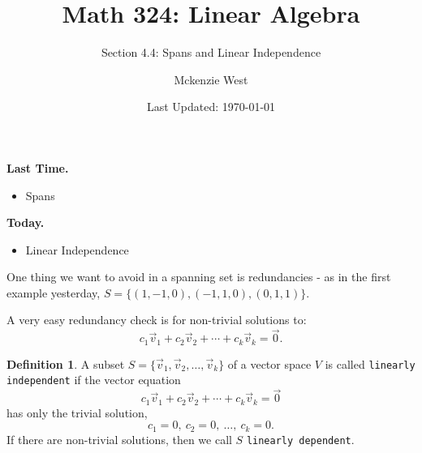\documentclass{beamer}
\newcommand{\fn}{\insertframenumber}
\theoremstyle{definition}
\newtheorem*{defn}{Definition}
\renewcommand{\emph}[1]{{\color{blue}\texttt{#1}}}
\begin{document}
	\title{Math 324: Linear Algebra}
	\subtitle{Section 4.4: Spans and Linear Independence}
	\author{Mckenzie West}
	\date{Last Updated: \today}
\begin{frame}
\maketitle
\end{frame}
\usebackgroundtemplate{} 
\begin{frame}{\insertframenumber}
	\begin{block}{\textbf{Last Time.}}
	\begin{itemize}[label=--]
		\item Spans
	\end{itemize}
	\end{block}
	\begin{block}{\textbf{Today.}}
		\begin{itemize}[label=--]
			\item Linear Independence
		\end{itemize}
	\end{block}
\end{frame}
\begin{frame}{\fn}
	One thing we want to avoid in a spanning set is redundancies - as in the first example yesterday, $S=\{(1,-1,0),(-1,1,0),(0,1,1)\}$. 
	
	A very easy redundancy check is for non-trivial solutions to:
		\[c_1\vec v_1+c_2\vec v_2+\cdots + c_k\vec v_k=\vec 0.\]
	\begin{defn}
		A subset $S=\{\vec v_1,\vec v_2,\dots,\vec v_k\}$ of a vector space $V$ is called \emph{linearly independent} if the vector equation
			\[c_1\vec v_1+c_2\vec v_2+\cdots+c_k\vec v_k=\vec 0\]
		has only the trivial solution,
			\[c_1=0,\ c_2=0,\ \dots,\ c_k=0.\]
		If there are non-trivial solutions, then we call $S$ \emph{linearly~dependent}.
	\end{defn}
\end{frame}
\end{document}
